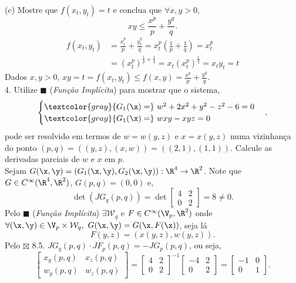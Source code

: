 (c) Mostre que \(f(x_t, y_t) = t \) e conclua que \(\forall x,y > 0\), 
\[ xy \leq \frac{x^p}{p} + \frac{y^q}{q}.  \]
\- \vspace{-0.5cm}
\textcolor{gris}{
\begin{align*}
f(x_t, y_t) &=  \frac{x_t^p}{p} + \frac{y_t^q}{q} = x_t^p \left(\frac{1}{p} + \frac{1}{q}\right) = x_t^p\\ 
&= (x_t^p)^{\frac{1}{p} + \frac{1}{q}} = x_t (x_t^{p})^{\frac{1}{q}} = x_ty_t = t 
\end{align*}
Dados \(x,y > 0\), \(xy = t = f(x_t, y_t) \leq f(x,y) = \frac{x^p}{p} + \frac{y^q}{q}\). 
}\\ 
4. Utilize \(\blacksquare\) (\emph{Função Implícita}) para mostrar que o sistema, 
\[\begin{cases}
    \textcolor{gray}{G_1(\x) = } \  w^2 + 2x^2+y^2 - z^2 - 6 = 0 \\ 
    \textcolor{gray}{G_1(\x) = } \  wxy - xyz = 0 
\end{cases}, \]
pode ser resolvido em termos de \(w = w(y,z)\) e \(x = x(y,z)\) numa vizinhança do ponto \((p,q) = ((y,z),(x,w)) = ((2,1),(1,1))\). Calcule as derivadas parciais de \(w\) e \(x\) em \(p\). \\
\textcolor{gris}{
    Sejam \(G(\x,\y) = (G_1(\x,\y), G_2(\x,\y)): \R^4 \to \R^2\). Note que \(G \in C^\infty (\R^4, \R^2) \), \(G(p,q) = (0,0)\) e,
    \[\det (JG_q(p,q)) = \det \begin{bmatrix}
        4 & 2 \\ 
        0 & 2
    \end{bmatrix} = 8 \neq 0.\]  
    Pelo \(\blacksquare\) (\emph{Função Implícita}) \(\exists \mathcal{W}_q\) e \(F\in C^\infty(\V_p, \R^2)\) onde \(\forall (\x, \y) \in \V_p \times \mathcal{W}_q, \ G(\x,\y ) = G(\x, F(\x))\), seja lá
    \[F(y,z) = (x(y,z), w(y,z)).\]  
    Pelo {\scriptsize \(\boxtimes\)} 8.5. \(JG_q(p,q)\cdot JF_p(p,q) = - JG_p(p,q)\), ou seja,
    \[ \begin{bmatrix}
        x_y(p,q) & x_z(p,q) \\
        w_y(p,q) & w_z(p,q) 
    \end{bmatrix}  = \begin{bmatrix}
        4 & 2 \\ 
        0 & 2
    \end{bmatrix}^{-1} \begin{bmatrix}
        -4 & 2 \\ 
        0 & 2
    \end{bmatrix} = \begin{bmatrix}
        -1 & 0 \\ 
        0& 1
    \end{bmatrix}.\]
}
